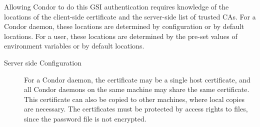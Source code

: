Allowing Condor to do this GSI authentication
requires knowledge of the locations of
the client-side certificate and the server-side list of
trusted CAs.
For a Condor daemon, these locations are determined
by configuration or by default locations.
For a user, these locations are determined by the
pre-set values of environment variables or by default locations.

\begin{description}
\item[Server side Configuration]

For a Condor daemon, the certificate may be a single host certificate,
and all Condor daemons on the same machine may share the same certificate.
This certificate can also be copied to other machines,
where local copies are necessary.
The certificates must be protected by access rights to files,
since the password file is not encrypted.



\end{description}
